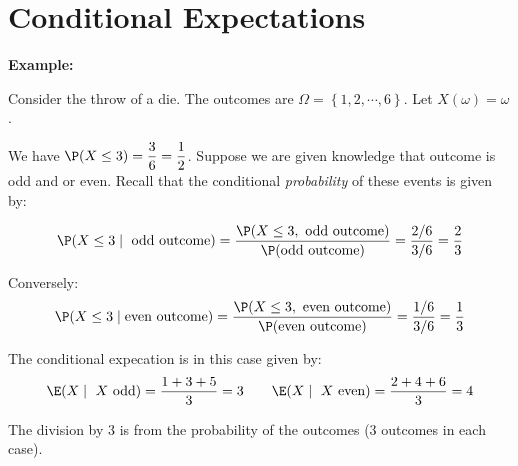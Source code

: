 \section{Conditional Expectations}
\noindent\textbf{Example:}\par
\noindent Consider the throw of a die. The outcomes are $\Omega = \left\{1,2,\cdots,6\right\}$. Let $X(\omega) = \omega$.\par
\noindent We have $\P(X\leq 3) = \dfrac{3}{6} = \dfrac{1}{2}$. Suppose we are given knowledge that outcome is odd and or even. Recall that the conditional \textit{probability} of these events is given by:\par
\begin{equation*}
  \begin{gathered}
    \P(X\leq 3\mid \text{ odd outcome}) = \dfrac{\P(X\leq 3,\text{ odd outcome})}{\P(\text{odd outcome})} = \dfrac{2/6}{3/6} = \dfrac{2}{3}
  \end{gathered}
\end{equation*}\par
\noindent Conversely:
\begin{equation*}
  \begin{gathered}
    \P(X\leq 3\mid\text{even outcome}) = \dfrac{\P(X\leq3,\text{ even outcome})}{\P(\text{even outcome})} = \dfrac{1/6}{3/6} = \dfrac{1}{3}
  \end{gathered}
\end{equation*}
\par\bigskip
\noindent The conditional expecation is in this case given by:
\begin{equation*}
  \begin{gathered}
    \E(X\mid\text{ $X$ odd}) = \dfrac{1+3+5}{3} = 3\qquad \E(X\mid\text{ $X$ even}) = \dfrac{2+4+6}{3} = 4
  \end{gathered}
\end{equation*}\par
\noindent The division by 3 is from the probability of the outcomes (3 outcomes in each case).
\par\bigskip
